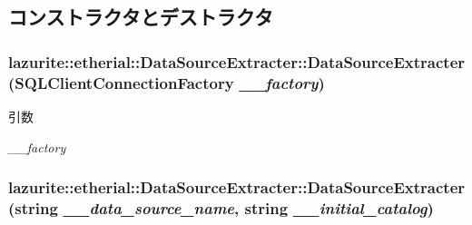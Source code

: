 \subsection{コンストラクタとデストラクタ}
\hypertarget{classlazurite_1_1etherial_1_1_data_source_extracter_a033223da89e7b0b10b7031c938d0b95b}{
\subsubsection[{DataSourceExtracter}]{\setlength{\rightskip}{0pt plus 5cm}lazurite::etherial::DataSourceExtracter::DataSourceExtracter ({\bf SQLClientConnectionFactory} {\em \_\-\_\-factory})}}
\label{classlazurite_1_1etherial_1_1_data_source_extracter_a033223da89e7b0b10b7031c938d0b95b}

\begin{DoxyParams}{引数}
\item[{\em \_\-\_\-factory}]\end{DoxyParams}
\hypertarget{classlazurite_1_1etherial_1_1_data_source_extracter_a75d47e54958726baabc202baf94a2802}{
\subsubsection[{DataSourceExtracter}]{\setlength{\rightskip}{0pt plus 5cm}lazurite::etherial::DataSourceExtracter::DataSourceExtracter (string {\em \_\-\_\-data\_\-source\_\-name}, \/  string {\em \_\-\_\-initial\_\-catalog})}}
\label{classlazurite_1_1etherial_1_1_data_source_extracter_a75d47e54958726baabc202baf94a2802}


